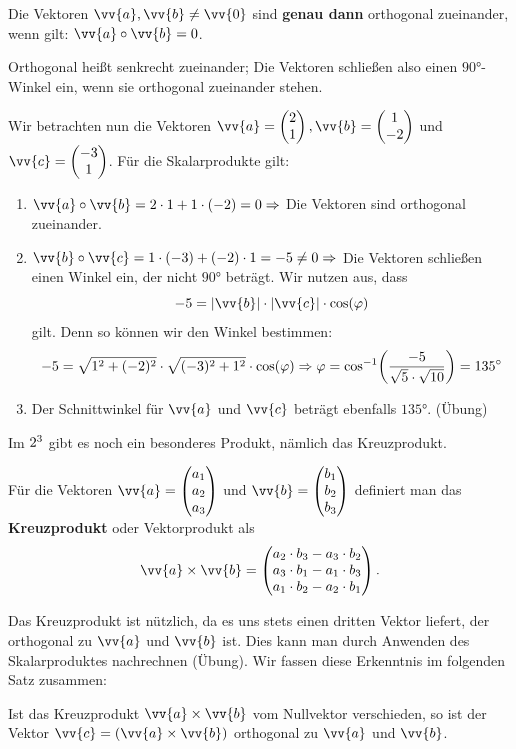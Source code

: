 \documentclass[ngerman, 12pt]{nssheetxea}
\begin{document}
\begin{theorem} Die Vektoren $\vv{a},\vv{b}\neq \vv{0}$ sind \textbf{genau dann} orthogonal zueinander, wenn gilt: $\vv{a} \circ \vv{b} = 0$. \par
Orthogonal heißt senkrecht zueinander; Die Vektoren schließen also einen $\ang{90}$-Winkel ein, wenn sie orthogonal zueinander stehen.
\end{theorem}

\begin{example}
Wir betrachten nun die Vektoren $\vv{a}=\colvec{2}{1}, \vv{b}=\colvec{1}{-2}$ und $\vv{c}=\colvec{-3}{1}$.
Für die Skalarprodukte gilt:
\begin{enumerate}
\item $\vv{a} \circ \vv{b} = 2\cdot 1 + 1 \cdot (-2) = 0 \Rightarrow$ Die Vektoren sind orthogonal zueinander.
\item $\vv{b} \circ \vv{c} = 1 \cdot (-3) + (-2) \cdot 1 = -5 \neq 0 \Rightarrow$ Die Vektoren schließen einen Winkel ein, der nicht $\ang{90}$ beträgt. Wir nutzen aus, dass
\[ -5 = |\vv{b}| \cdot |\vv{c}| \cdot \cos (\varphi)\]
gilt. Denn so können wir den Winkel bestimmen:
\[ -5 = \sqrt{1^2+(-2)^2} \cdot \sqrt{(-3)^2+1^2} \cdot \cos (\varphi) \Rightarrow \varphi = \cos^{-1} \mleft( \dfrac{-5}{\sqrt{5}\cdot \sqrt{10}} \mright) = \ang{135}\]
\item Der Schnittwinkel für $\vv{a}$ und $\vv{c}$ beträgt ebenfalls $\ang{135}$. (Übung)
\end{enumerate}
\end{example}

Im $2^3$ gibt es noch ein besonderes \glqq Produkt\grqq , nämlich das Kreuzprodukt.

\begin{definition}
Für die Vektoren $\vv{a}=\colvec[a_1]{a_2}{a_3}$ und $\vv{b}=\colvec[b_1]{b_2}{b_3}$ definiert man das \textbf{Kreuzprodukt} oder Vektorprodukt  als
\[ \vv{a} \times \vv{b} = \colvec[a_2\cdot b_3-a_3\cdot b_2]{a_3\cdot b_1-a_1\cdot b_3}{a_1\cdot b_2 - a_2 \cdot b_1}.\]
\end{definition}

Das Kreuzprodukt ist nützlich, da es uns stets einen dritten Vektor liefert, der orthogonal zu $\vv{a}$ und $\vv{b}$ ist. Dies kann man durch Anwenden des Skalarproduktes nachrechnen (Übung). Wir fassen diese Erkenntnis im folgenden Satz zusammen:

\begin{theorem}
Ist das Kreuzprodukt $\vv{a}\times \vv{b}$ vom Nullvektor verschieden, so ist der Vektor $\vv{c}=(\vv{a}\times \vv{b})$ orthogonal zu $\vv{a}$ und $\vv{b}$.
\end{theorem}
\end{document}

